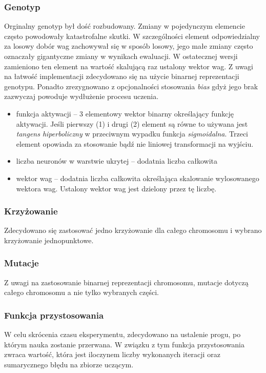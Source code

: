\documentclass{llncs}
\begin{document}
\subsubsection{Genotyp}
Orginalny genotyp był dość rozbudowany. Zmiany w pojedynczym elemencie często powodowały katastrofalne skutki.
W szczególności element odpowiedzialny za losowy dobór wag zachowywał się w sposób losowy, jego małe zmiany
często oznaczały gigantyczne zmiany w wynikach ewaluacji. W ostatecznej wersji zamieniono ten element na 
wartość skalującą raz ustalony wektor wag.
Z uwagi na łatwość implementacji zdecydowano się na użycie binarnej reprezentacji genotypu. 
Ponadto zrezygnowano z opcjonalności stosowania \emph{bias} gdyż jego brak zazwyczaj
powoduje wydłużenie procesu uczenia.
\begin{itemize}
	\item funkcja aktywacji -- 3 elementowy wektor binarny określający funkcję aktywacji. Jeśli pierwszy (1) i 
	drugi (2) element są równe to używana jest \emph{tangens hiperboliczny} w przeciwnym wypadku funkcja \emph{sigmoidalna}.
	Trzeci element opowiada za stosowanie bądź nie liniowej transformacji na wyjściu.
	\item liczba neuronów w warstwie ukrytej -- dodatnia liczba całkowita
	\item wektor wag -- dodatnia liczba całkowita określająca skalowanie wylosowanego wektora wag.
	Ustalony wektor wag jest dzielony przez tę liczbę.
\end{itemize}

\subsubsection{Krzyżowanie}
Zdecydowano się zastosować jedno krzyżowanie dla całego chromosomu i wybrano krzyżowanie
jednopunktowe.

\subsubsection{Mutacje}
Z uwagi na zastosowanie binarnej reprezentacji chromosomu, mutacje dotyczą całego chromosomu 
a nie tylko wybranych części.

\subsubsection{Funkcja przystosowania}
W celu skrócenia czasu eksperymentu, zdecydowano na ustalenie progu, po którym nauka zostanie przerwana.
W związku z tym funkcja przystosowania zwraca wartość, która jest iloczynem
liczby wykonanych iteracji oraz sumarycznego błędu na zbiorze uczącym.
\end{document}
